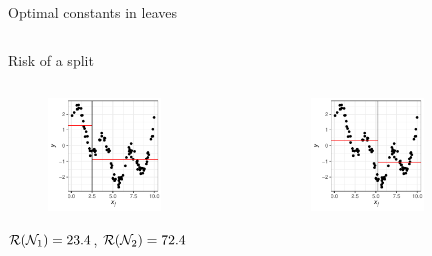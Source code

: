 \documentclass[11pt,compress,t,notes=noshow, xcolor=table]{beamer}
\begin{document}
\begin{vbframe}{Optimal constants in leaves}
\begin{columns}
\begin{column}{0.5\textwidth}
\end{column}
\end{columns}

\end{vbframe}

\begin{vbframe}{Risk of a split}

\begin{columns}
\begin{column}{0.5\textwidth}


\begin{figure}
\includegraphics[width=0.7\textwidth]{figure/splitcrit_optimal-constant-sub1.pdf} 
\end{figure}

$\mathcal{R}(\mathcal{N}_1) = 23.4$, $\mathcal{R}(\mathcal{N}_2) = 72.4$ 
 
\end{column}
\begin{column}{0.5\textwidth}

\begin{figure}
\includegraphics[width=0.7\textwidth]{figure/splitcrit_optimal-constant-sub2.pdf} 
\end{figure}


\end{column}
\end{columns}
\end{vbframe}
\end{document}

